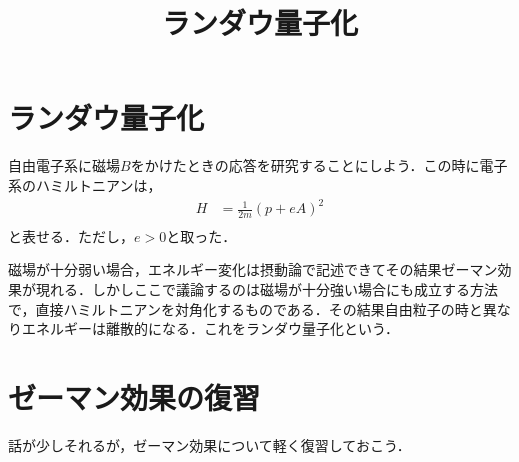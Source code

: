 \documentclass[a4j]{jarticle}
\title{ランダウ量子化}
\begin{document}
\section{ランダウ量子化}
自由電子系に磁場$B$をかけたときの応答を研究することにしよう．この時に電子系のハミルトニアンは，
\begin{align*}
 H&=\frac{1}{2m}\left(p+eA\right)^2 \\
\end{align*}
と表せる．ただし，$e>0$と取った．

磁場が十分弱い場合，エネルギー変化は摂動論で記述できてその結果ゼーマン効果が現れる．しかしここで議論するのは磁場が十分強い場合にも成立する方法で，直接ハミルトニアンを対角化するものである．その結果自由粒子の時と異なりエネルギーは離散的になる．これをランダウ量子化という．


\section{ゼーマン効果の復習}
話が少しそれるが，ゼーマン効果について軽く復習しておこう．
\end{document}
